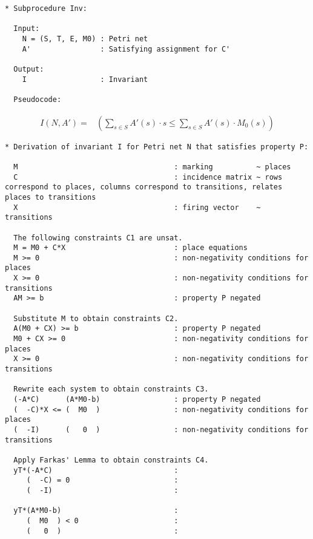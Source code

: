 \begin{verbatim}
* Subprocedure Inv:

  Input:
    N = (S, T, E, M0) : Petri net
    A'                : Satisfying assignment for C'

  Output:
    I                 : Invariant

  Pseudocode:
\end{verbatim}

\begin{align*}
  I(N, A') =& \left( \sum_{s \in S} A'(s) \cdot s \le
                     \sum_{s \in S} A'(s) \cdot M_0(s) \right)
\end{align*}

\newpage

\begin{verbatim}
* Derivation of invariant I for Petri net N that satisfies property P:

  M                                    : marking          ~ places
  C                                    : incidence matrix ~ rows correspond to places, columns correspond to transitions, relates places to transitions
  X                                    : firing vector    ~ transitions

  The following constraints C1 are unsat.
  M = M0 + C*X                         : place equations
  M >= 0                               : non-negativity conditions for places
  X >= 0                               : non-negativity conditions for transitions
  AM >= b                              : property P negated

  Substitute M to obtain constraints C2.
  A(M0 + CX) >= b                      : property P negated
  M0 + CX >= 0                         : non-negativity conditions for places
  X >= 0                               : non-negativity conditions for transitions

  Rewrite each system to obtain constraints C3.
  (-A*C)      (A*M0-b)                 : property P negated
  (  -C)*X <= (  M0  )                 : non-negativity conditions for places
  (  -I)      (   0  )                 : non-negativity conditions for transitions

  Apply Farkas' Lemma to obtain constraints C4.
  yT*(-A*C)                            : 
     (  -C) = 0                        : 
     (  -I)                            : 

  yT*(A*M0-b)                          : 
     (  M0  ) < 0                      : 
     (   0  )                          : 


\end{verbatim}
